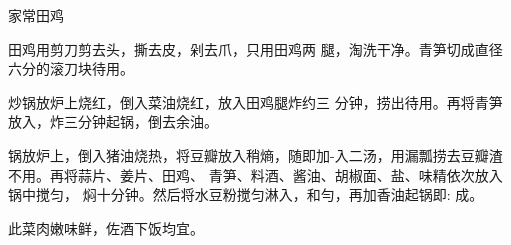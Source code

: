 \begin{recipe}{家常田鸡}

\ingredients


\cooking

\step 田鸡用剪刀剪去头，撕去皮，剁去爪，只用田鸡两 腿，淘洗干净。青笋切成直径六分的滚刀块待用。

炒锅放炉上烧红，倒入菜油烧红，放入田鸡腿炸约三 分钟，捞出待用。再将青笋放入，炸三分钟起锅，倒去余油。

\step 锅放炉上，倒入猪油烧热，将豆瓣放入稍熵，随即加-入二汤，用漏瓢捞去豆瓣渣不用。再将蒜片、姜片、田鸡、 青笋、料酒、酱油、胡椒面、盐、味精依次放入锅中搅匀， 焖十分钟。然后将水豆粉搅匀淋入，和勻，再加香油起锅即: 成。

\notes

此菜肉嫩味鲜，佐酒下饭均宜。

\end{recipe}

